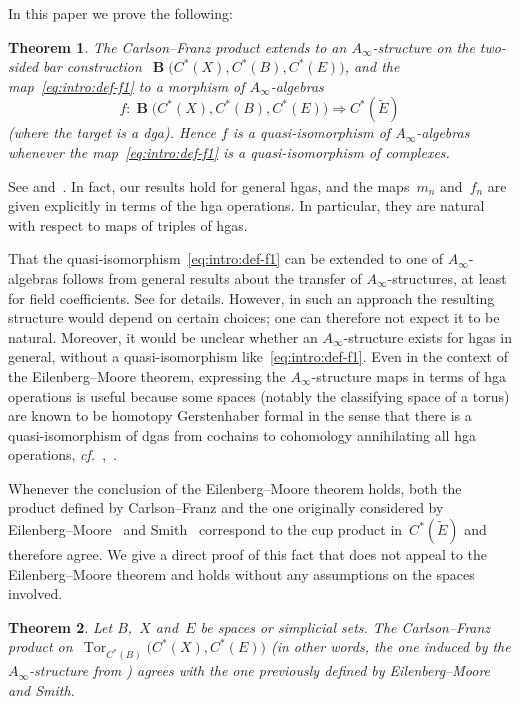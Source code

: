 \documentclass[letterpaper]{amsart}
\numberwithin{equation}{section}
\theoremstyle{plain}
\newtheorem{theorem}{Theorem}[section]
\theoremstyle{definition}
\theoremstyle{remark}
\def\cf{\emph{cf.}}
\DeclareMathOperator{\Tor}{Tor}
\def\Ainf{A_{\infty}}
\DeclareMathOperator{\BB}{\mathbf{B}}
\def\gE{\tilde{E}}
\begin{document}
In this paper we prove the following:

\begin{theorem}
  \label{thm:main-1}
  The Carlson--Franz product extends to an $\Ainf$-structure on the two-sided bar construction~$\BB\bigl(C^{*}(X),C^{*}(B),C^{*}(E)\bigr)$,
  and the map~\eqref{eq:intro:def-f1} to a morphism of $\Ainf$-algebras
  \begin{equation}
    f\colon \BB\bigl(C^{*}(X),C^{*}(B),C^{*}(E)\bigr) \Rightarrow C^{*}(\gE)
  \end{equation}
  (where the target is a dga).
  Hence $f$ is a quasi-isomorphism of $\Ainf$-algebras
  whenever the map~\eqref{eq:intro:def-f1} is a quasi-isomorphism of complexes.
\end{theorem}

See  and~.
In fact, our results hold for general hgas, and the maps~$m_{n}$
and~$f_{n}$ are given explicitly in terms of the hga operations. In particular, they are natural
with respect to maps of triples of hgas.

That the quasi-isomorphism~\eqref{eq:intro:def-f1} can be extended to one of $\Ainf$-algebras
follows from general results about the transfer of $\Ainf$-structures, at least for field coefficients.
See  for details.
However, in such an approach the resulting structure would depend on certain choices;
one can therefore not expect it to be natural.
Moreover, it would be unclear whether an $\Ainf$-structure exists for hgas in general,
without a quasi-isomorphism like~\eqref{eq:intro:def-f1}.
Even in the context of the Eilenberg--Moore theorem,
expressing the $\Ainf$-structure maps in terms of hga operations is useful because
some spaces (notably the classifying space of a torus) are known to be homotopy Gerstenhaber formal
in the sense that there is a quasi-iso\-mor\-phism of dgas from cochains to cohomology
annihilating all hga operations, \cf~\cite[Thm.~9.6]{Franz:homog},~\cite[Thm.~1.3]{Franz:gersten}.

Whenever the conclusion of the Eilenberg--Moore theorem holds, both the product defined by Carlson--Franz
and the one originally considered by Eilenberg--Moore~\cite{EilenbergMoore:1966} and Smith~\cite{Smith:1967}
correspond to the cup product in~$C^{*}(\gE)$ and therefore agree.
We give a direct proof of this fact that does not appeal to the Eilenberg--Moore theorem
and holds without any assumptions on the spaces involved.

\begin{theorem}
  \label{thm:main-2}
  Let $B$,~$X$ and~$E$ be spaces or simplicial sets.
  The Carlson--Franz product on~$\Tor_{C^{*}(B)}\bigl(C^{*}(X),C^{*}(E)\bigr)$
  (in other words, the one induced by the $\Ainf$-structure from )
  agrees with the one previously defined by Eilenberg--Moore and Smith.
\end{theorem}
\end{document}
